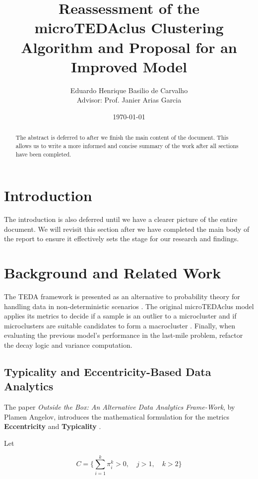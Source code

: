 \documentclass[a4paper]{article}
\title{Reassessment of the microTEDAclus Clustering Algorithm and Proposal for an Improved Model}
\author{Eduardo Henrique Basilio de Carvalho \\ Advisor: Prof. Janier Arias Garcia}
\date{\today}
\begin{document}
\maketitle

\begin{abstract}
    The abstract is deferred to after we finish the main content of the document. This allows us to write a more informed and concise summary of the work after all sections have been completed.
\end{abstract}

\section{Introduction}
The introduction is also deferred until we have a clearer picture of the entire document. We will revisit this section after we have completed the main body of the report to ensure it effectively sets the stage for our research and findings.

\section{Background and Related Work}

The TEDA framework is presented as an alternative to probability theory for handling data in non-deterministic scenarios \cite{angelov2014outside}. The original microTEDAclus model applies its metrics to decide if a sample is an outlier to a microcluster and if microclusters are suitable candidates to form a macrocluster \cite{maia2020evolvclus}. Finally, when evaluating the previous model's performance in the last-mile problem, \cite{galindo2021lastmile} refactor the decay logic and variance computation.

\subsection{Typicality and Eccentricity-Based Data Analytics}

The paper \textit{Outside the Box: An Alternative Data Analytics Frame-Work}, by Plamen Angelov, introduces the mathematical formulation for the metrics \textbf{Eccentricity} and \textbf{Typicality} \cite{angelov2014outside}.

Let

\begin{equation}
    C = \{ \sum_{i=1}^{k} \pi^k_i > 0,\quad j > 1,\quad k > 2 \}
\end{equation}
\end{document}
